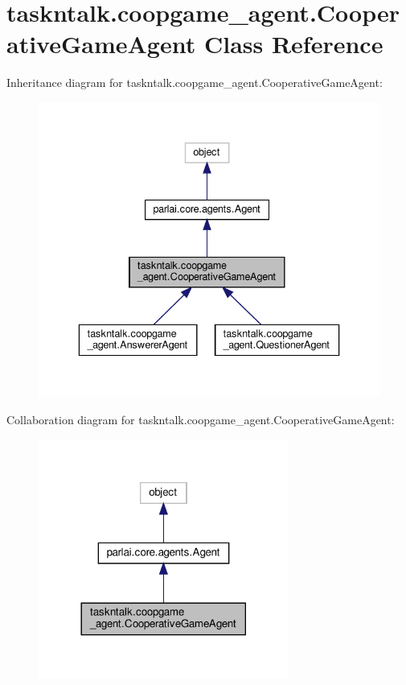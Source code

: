 \hypertarget{classtaskntalk_1_1coopgame__agent_1_1CooperativeGameAgent}{}\section{taskntalk.\+coopgame\+\_\+agent.\+Cooperative\+Game\+Agent Class Reference}
\label{classtaskntalk_1_1coopgame__agent_1_1CooperativeGameAgent}


Inheritance diagram for taskntalk.\+coopgame\+\_\+agent.\+Cooperative\+Game\+Agent\+:
\nopagebreak
\begin{figure}[H]
\begin{center}
\leavevmode
\includegraphics[width=336pt]{classtaskntalk_1_1coopgame__agent_1_1CooperativeGameAgent__inherit__graph}
\end{center}
\end{figure}


Collaboration diagram for taskntalk.\+coopgame\+\_\+agent.\+Cooperative\+Game\+Agent\+:
\nopagebreak
\begin{figure}[H]
\begin{center}
\leavevmode
\includegraphics[width=233pt]{classtaskntalk_1_1coopgame__agent_1_1CooperativeGameAgent__coll__graph}
\end{center}
\end{figure}
